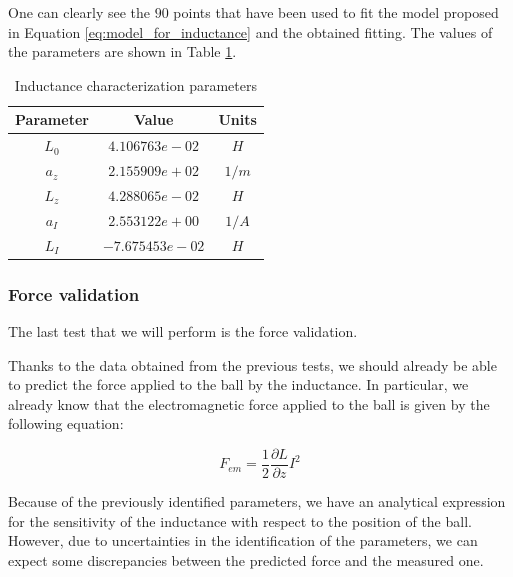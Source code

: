 One can clearly see the $90$ points that have been used to fit the model proposed in Equation \ref{eq:model_for_inductance} and the obtained fitting.
The values of the parameters are shown in Table \ref{tab:inductance_characterization_parameters}.

\begin{table}[H]
    \centering
    \begin{tabular}{|c|c|c|}
        \hline
        \textbf{Parameter} & \textbf{Value}  & \textbf{Units} \\
        \hline
        $L_0$              & $4.106763e-02$  & $H$            \\
        $a_z$              & $2.155909e+02$  & $1/m$          \\
        $L_z$              & $4.288065e-02$  & $H$            \\
        $a_I$              & $2.553122e+00$  & $1/A$          \\
        $L_I$              & $-7.675453e-02$ & $H$            \\
        \hline
    \end{tabular}

    \caption{Inductance characterization parameters}
    \label{tab:inductance_characterization_parameters}

\end{table}

\subsubsection{Force validation}
\label{subsubsec:force_validation}

The last test that we will perform is the force validation.

Thanks to the data obtained from the previous tests, we should already be able to predict the force applied to the ball by the inductance.
In particular, we already know that the electromagnetic force applied to the ball is given by the following equation:

\begin{equation}
    F_{em} = \frac{1}{2} \frac{\partial L}{\partial z} I^2
\end{equation}

Because of the previously identified parameters, we have an analytical expression for the sensitivity of the inductance with respect to the position of the ball.
However, due to uncertainties in the identification of the parameters, we can expect some discrepancies between the predicted force and the measured one.

